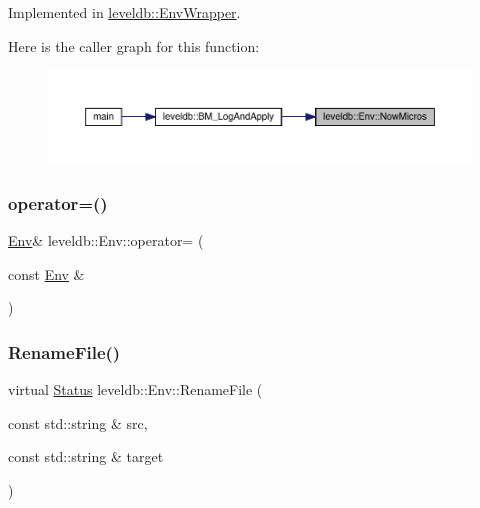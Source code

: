 Implemented in \mbox{\hyperlink{classleveldb_1_1_env_wrapper_ad037f3ac120367d5499e0c61e39785a3}{leveldb\+::\+Env\+Wrapper}}.

Here is the caller graph for this function\+:
\nopagebreak
\begin{figure}[H]
\begin{center}
\leavevmode
\includegraphics[width=350pt]{classleveldb_1_1_env_a988062bcd558ac02c62522ac2c8aa39f_icgraph}
\end{center}
\end{figure}
\mbox{\label{classleveldb_1_1_env_a9f5edd8301a1a50a41483af37f66b664}} 
\subsubsection{\texorpdfstring{operator=()}{operator=()}}
{\footnotesize\ttfamily \mbox{\hyperlink{classleveldb_1_1_env}{Env}}\& leveldb\+::\+Env\+::operator= (\begin{DoxyParamCaption}\item[{const \mbox{\hyperlink{classleveldb_1_1_env}{Env}} \&}]{ }\end{DoxyParamCaption})\hspace{0.3cm}{\ttfamily [delete]}}

\mbox{\label{classleveldb_1_1_env_abd743b3d4751ada1ab307427827ed5b0}} 
\subsubsection{\texorpdfstring{RenameFile()}{RenameFile()}}
{\footnotesize\ttfamily virtual \mbox{\hyperlink{classleveldb_1_1_status}{Status}} leveldb\+::\+Env\+::\+Rename\+File (\begin{DoxyParamCaption}\item[{const std\+::string \&}]{src,  }\item[{const std\+::string \&}]{target }\end{DoxyParamCaption})\hspace{0.3cm}{\ttfamily [pure virtual]}}



